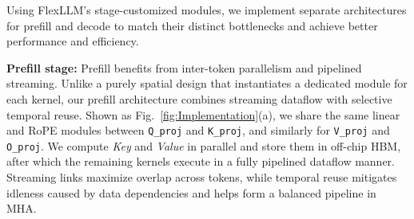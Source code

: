 \documentclass[conference]{IEEEtran}
\begin{document}



Using FlexLLM's stage-customized modules, we implement separate architectures for prefill and decode to match their distinct bottlenecks and achieve better performance and efficiency.

\textbf{Prefill stage:}  
Prefill benefits from inter-token parallelism and pipelined streaming. Unlike a purely spatial design that instantiates a dedicated module for each kernel, our prefill architecture combines streaming dataflow with selective temporal reuse. Shown as Fig.~\ref{fig:Implementation}(a), we share the same linear and RoPE modules between \texttt{Q\_proj} and \texttt{K\_proj}, and similarly for \texttt{V\_proj} and \texttt{O\_proj}. We compute \textit{Key} and \textit{Value} in parallel and store them in off-chip HBM, after which the remaining kernels execute in a fully pipelined dataflow manner. Streaming links maximize overlap across tokens, while temporal reuse mitigates idleness caused by data dependencies and helps form a balanced pipeline in MHA.
\end{document}

